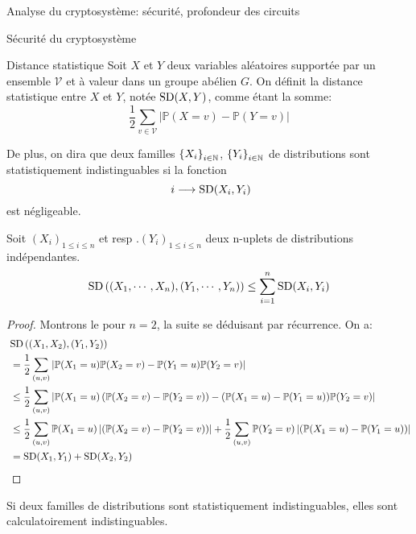 \begin{section}{Analyse du cryptosystème: sécurité, profondeur des circuits}
	\begin{subsection}{Sécurité du cryptosystème}

	\begin{definition}{Distance statistique}
	Soit $X$ et $Y$ deux variables aléatoires supportée par
	un ensemble $\mathcal{V}$ et à valeur 
	dans un groupe abélien $G$. On définit la distance 
	statistique entre $X$ et $Y$, notée $\text{SD}(X,Y)$, 
	comme étant la somme:
	\[ \frac{1}{2} \sum_{v \in \mathcal{V}} |\mathbb{P}(X = v) -
	\mathbb{P}(Y = v)| \]

	De plus, on dira que deux familles ${\{X_i\}}_{i \in \mathbb{N}}$, ${\{Y_i\}}_{i \in \mathbb{N}}$
	de distributions sont statistiquement indistinguables si 
	la fonction 
	\[ i \longrightarrow \SD(X_i, Y_i) \]
	est négligeable.



	\end{definition}
	\begin{prop} \label{sd_add}
	Soit ${(X_i)}_{1\leq i \leq n}$ et resp .${(Y_i)}_{1\leq i\leq n}$
	deux n-uplets de distributions indépendantes.
	\[ \text{SD}\left((X_1,\cdots,X_n), (Y_1, \cdots, Y_n)\right) \leq \sum_{i=1}^n \text{SD}(X_i,Y_i) \]
	\end{prop}




	\begin{proof}
	Montrons le pour $n = 2$, la suite se déduisant par récurrence.
	On a:
	\begin{align*}
		&\SD\left((X_1,X_2),(Y_1,Y_2)\right) \\
		&= \frac{1}{2} \sum_{(u,v)}\left| \PP(X_1=u)\PP(X_2=v) -
		\PP(Y_1=u)\PP(Y_2=v) \right| \\ 
		&\leq 
		\frac{1}{2} \sum_{(u,v)}\left| \PP(X_1=u)\left(\PP(X_2=v) - \PP(Y_2 = v)\right)
		- (\PP(X_1 = u) - \PP(Y_1=u))\PP(Y_2=v) \right| \\
		&\leq
		\frac{1}{2} \sum_{(u,v)} \PP(X_1 = u)
		\left|\left(\PP(X_2=v) - \PP(Y_2 = v)\right) \right| + 
		\frac{1}{2} \sum_{(u,v)}\PP(Y_2=v)\left|(\PP(X_1 = u) - \PP(Y_1=u)) \right| \\
		&= \SD(X_1, Y_1) + \SD(X_2, Y_2)
	\end{align*}
	\end{proof}
	\begin{prop}
	Si deux familles de distributions sont statistiquement
	indistinguables, elles sont calculatoirement indistinguables.
	\end{prop} 


\end{subsection}
\end{section}
